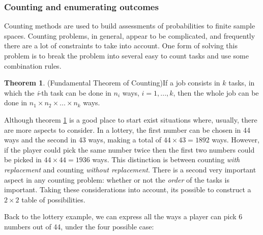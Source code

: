 \documentclass[
  oneside,
  11pt, a4paper,
  footinclude=true,
  headinclude=true,
  cleardoublepage=empty
]{scrbook}
\theoremstyle{definition}
\theoremstyle{definition}
\newtheorem{theorem}{Theorem}[section]
\begin{document}
        \subsubsection{Counting and enumerating outcomes}
        
        Counting methods are used to build assessments of probabilities to finite sample spaces. Counting problems, in general, appear to be complicated, and frequently there are a lot of constraints to take into account. One form of solving this problem is to break the problem into several easy to count tasks and use some combination rules.
        
        \begin{theorem}{(Fundamental Theorem of Counting)}\label{t-2-1-5}
            If a job consists in $k$ tasks, in which the \emph{i}-th task can be done in $n_i$ ways, $i = 1,...,k$, then the whole job can be done in $n_1 \times n_2 \times ... \times n_k$ ways.
        \end{theorem}{}
        
        Although theorem \ref{t-2-1-5} is a good place to start exist situations where, usually, there are more aspects to consider. In a lottery, the first number can be chosen in 44 ways and the second in 43 ways, making a total of $44 \times 43 = 1892$ ways. However, if the player could pick the same number twice then the first two numbers could be picked in $44 \times 44 = 1936$ ways. This distinction is between counting \emph{with replacement} and counting \emph{without replacement}. There is a second very important aspect in any counting problem: whether or not the \emph{order} of the tasks is important. Taking these considerations into account, its possible to construct a $2 \times 2$ table of possibilities.
        
        Back to the lottery example, we can express all the ways a player can pick 6 numbers out of 44, under the four possible case:
        
\end{document}
